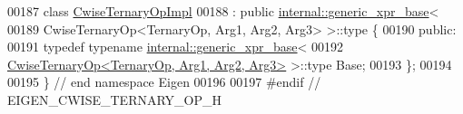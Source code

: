 \begin{DoxyCode}
00187 \textcolor{keyword}{class }\hyperlink{class_eigen_1_1_cwise_ternary_op_impl}{CwiseTernaryOpImpl}
00188     : \textcolor{keyword}{public} \hyperlink{struct_eigen_1_1internal_1_1generic__xpr__base}{internal::generic\_xpr\_base}<
00189           CwiseTernaryOp<TernaryOp, Arg1, Arg2, Arg3> >::type \{
00190  \textcolor{keyword}{public}:
00191   \textcolor{keyword}{typedef} \textcolor{keyword}{typename} \hyperlink{struct_eigen_1_1internal_1_1generic__xpr__base}{internal::generic\_xpr\_base}<
00192       \hyperlink{group___core___module_class_eigen_1_1_cwise_ternary_op}{CwiseTernaryOp<TernaryOp, Arg1, Arg2, Arg3>} >::type Base;
00193 \};
00194 
00195 \}  \textcolor{comment}{// end namespace Eigen}
00196 
00197 \textcolor{preprocessor}{#endif  // EIGEN\_CWISE\_TERNARY\_OP\_H}
\end{DoxyCode}
